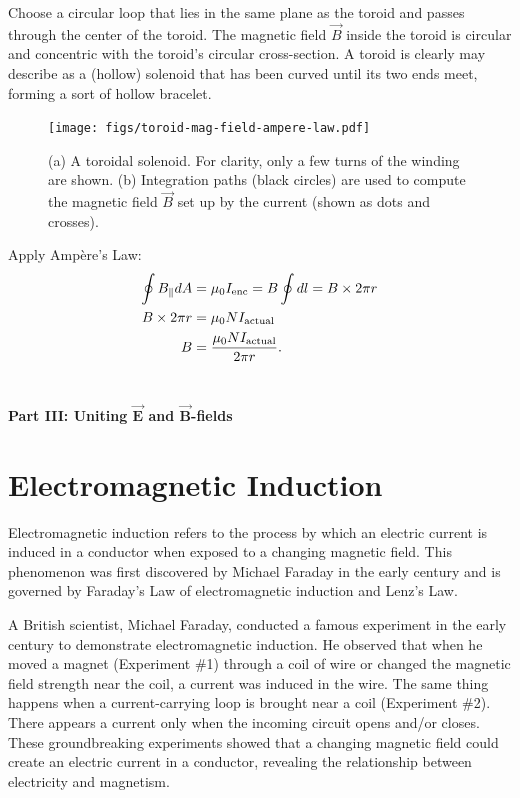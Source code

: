 \documentclass[12pt,b4paper]{article}
\begin{document}
Choose a circular loop that lies in the same plane as the toroid and passes through the center of the toroid. The magnetic field $\vec{B}$ inside the toroid is circular and concentric with the toroid's circular cross-section. A toroid is clearly may describe as a (hollow) solenoid that has been curved until its two ends meet, forming a sort of hollow bracelet.
\begin{figure}[H]
    \centering
    \texttt{[image: figs/toroid-mag-field-ampere-law.pdf]}
    \caption{(a) A toroidal solenoid. For clarity, only a few turns of the winding are shown. (b) Integration paths (black circles) are used to compute the magnetic field $\vec{B}$ set up by the current (shown as dots and crosses).}
    \label{fig:toroid-mag-field-ampere-law}
\end{figure}
Apply Ampère's Law:
\begin{align}
    \oint B_\parallel dA&=\mu_0 I_\text{enc}=B\oint dl=B\times2\pi r\notag\\
    B\times2\pi r&=\mu_0NI_\text{actual}\notag\\
    B&=\frac{\mu_0NI_\text{actual}}{2\pi r}.
\end{align}
\clearpage
\bigskip \
\vspace{10cm}
\vskip 20pt
\begin{center}
    \thispagestyle{empty}
    \huge{\selectfont \bf \sffamily Part III: Uniting $\boldsymbol{\vec{E}}$ and $\boldsymbol{\vec{B}}$-fields}
\end{center}
\vfill
\clearpage
\section{Electromagnetic Induction}
\thispagestyle{empty}
Electromagnetic induction refers to the process by which an electric current is induced in a conductor when exposed to a changing magnetic field. This phenomenon was first discovered by Michael Faraday in the early  century and is governed by Faraday's Law of electromagnetic induction and Lenz's Law.

A British scientist, Michael Faraday, conducted a famous experiment in the early  century to demonstrate electromagnetic induction. He observed that when he moved a magnet (Experiment \#1) through a coil of wire or changed the magnetic field strength near the coil, a current was induced in the wire. The same thing happens when a current-carrying loop is brought near a coil (Experiment \#2). There appears a current only when the incoming circuit opens and/or closes. These groundbreaking experiments showed that a changing magnetic field could create an electric current in a conductor, revealing the relationship between electricity and magnetism.
\end{document}
